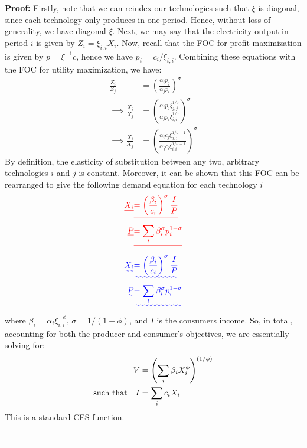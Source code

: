 \documentclass[11pt,a4paper,leqno]{extarticle}
\newenvironment{proof}[1][Proof]{\noindent\textbf{#1:} }{\ \rule{0.5em}{0.5em}}
\providecommand{\DIFadd}[1]{{\protect\color{blue}\uwave{#1}}} %
\providecommand{\DIFdel}[1]{{\protect\color{red}\sout{#1}}}                      %
\providecommand{\DIFaddbegin}{} %
\providecommand{\DIFaddend}{} %
\providecommand{\DIFdelbegin}{} %
\providecommand{\DIFdelend}{} %
\begin{document}
\begin{proof}
	Firstly, note that we can reindex our technologies such that $\xi$ is diagonal, since each technology only produces in one period. Hence, without loss of generality, we have diagonal $\xi$. Next, we may say that the electricity output in period $i$ is given by $Z_i = \xi_{i,i} X_i$. Now, recall that the FOC for profit-maximization is given by $p = \xi^{-1} c$, hence we have $p_i = c_i / \xi_{i,i}$.  Combining these equations with the FOC for utility maximization, we have:
	\begin{align*}
	\frac{Z_i}{Z_j} &= \left( \frac{\alpha_i p_j}{\alpha_j p_i} \right)^\sigma \\
	\implies \frac{ X_i }{X_j} &= \left( \frac{ \alpha_i p_j \xi_{j,j}^{1/\sigma} }{ \alpha_j p_i \xi_{i,i}^{1/\sigma} } \right)^\sigma \\
	\implies \frac{ X_i }{X_j} &= \left( \frac{ \alpha_i c_j \xi_{j,j}^{1/\sigma - 1} }{ \alpha_j c_i \xi_{i,i}^{1/\sigma - 1} } \right)^\sigma
	\end{align*}
	By definition, the elasticity of substitution between any two, arbitrary technologies $i$ and $j$ is constant. Moreover, it can be shown that this FOC can be rearranged to give the following demand equation for each technology $i$
	\DIFdelbegin \begin{eqnarray*}
		\DIFdel{X_i }&\DIFdel{= \left(\frac{\beta_i}{c_i} \right)^\sigma \frac{I}{P} }\\
		\DIFdel{P }&\DIFdel{= \sum_t \beta_i^\sigma p_i^{1-\sigma}
	}\end{eqnarray*}%
	\DIFdelend \DIFaddbegin \begin{align*}
	\DIFadd{X_i }&\DIFadd{= \left(\frac{\beta_i}{c_i} \right)^\sigma \frac{I}{P} }\\
	\DIFadd{P }&\DIFadd{= \sum_t \beta_i^\sigma p_i^{1-\sigma}
	}\end{align*}\DIFaddend 
	where $\beta_i = \alpha_i \xi_{i,i}^{-\phi}$, $\sigma = 1 / (1-\phi)$, and $I$ is the consumers income.	So, in total, accounting for both the producer and consumer's objectives, we are essentially solving for: 
	\begin{align*} 
	V &= \left( \sum_i \beta_i X_i^\phi \right)^{(1/\phi)}  \\
	\text{such that\quad} I &= \sum_i c_i X_i 
	\end{align*}
	This is a standard CES function.
	\\ \hfill
\end{proof}
\end{document}
